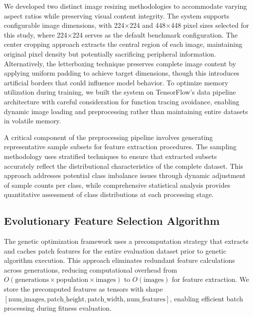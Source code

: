 \documentclass[runningheads]{llncs}
\begin{document}
We developed two distinct image resizing methodologies to accommodate varying aspect ratios while preserving visual content integrity. The system supports configurable image dimensions, with 224×224 and 448×448 pixel sizes selected for this study, where 224×224 serves as the default benchmark configuration. The center cropping approach extracts the central region of each image, maintaining original pixel density but potentially sacrificing peripheral information. Alternatively, the letterboxing technique preserves complete image content by applying uniform padding to achieve target dimensions, though this introduces artificial borders that could influence model behavior. To optimize memory utilization during training, we built the system on TensorFlow's data pipeline architecture with careful consideration for function tracing avoidance, enabling dynamic image loading and preprocessing rather than maintaining entire datasets in volatile memory.

A critical component of the preprocessing pipeline involves generating representative sample subsets for feature extraction procedures. The sampling methodology uses stratified techniques to ensure that extracted subsets accurately reflect the distributional characteristics of the complete dataset. This approach addresses potential class imbalance issues through dynamic adjustment of sample counts per class, while comprehensive statistical analysis provides quantitative assessment of class distributions at each processing stage.

\subsection{Evolutionary Feature Selection Algorithm}
The genetic optimization framework uses a precomputation strategy that extracts and caches patch features for the entire evaluation dataset prior to genetic algorithm execution. This approach eliminates redundant feature calculations across generations, reducing computational overhead from $O(\text{generations} \times \text{population} \times \text{images})$ to $O(\text{images})$ for feature extraction. We store the precomputed features as tensors with shape $[\text{num\_images}, \text{patch\_height}, \text{patch\_width}, \text{num\_features}]$, enabling efficient batch processing during fitness evaluation.
\end{document}
